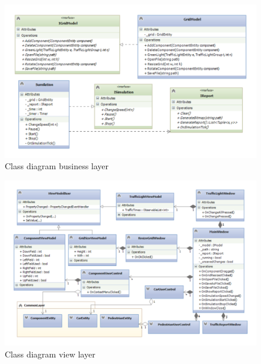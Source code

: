\begin{landscape}
	\begin{figure}[!ht]
		\centering
		\includegraphics[height=\textheight]{figures/BusinessLayer}
		\caption{Class diagram business layer}
		\label{fig:bus}
	\end{figure}
\end{landscape}

\begin{landscape}
	\begin{figure}[!ht]
		\centering
		\includegraphics[height=\textheight]{figures/PresentationLayer}
		\caption{Class diagram view layer}
		\label{fig:pres}
	\end{figure}
\end{landscape}




